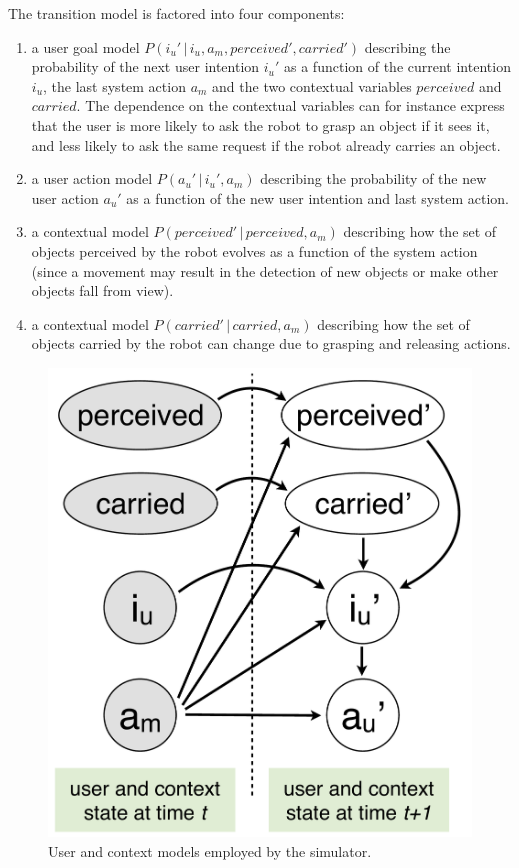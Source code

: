 The transition model is factored into four components:
\begin{enumerate}
\item a user goal model $P(i_u' \, | \, i_u, a_m, \mathit{perceived}', \mathit{carried}')$ describing the probability of the next user intention $i_u'$ as a function of the current intention $i_u$, the last system action $a_m$ and the two contextual variables $\mathit{perceived}$ and $\mathit{carried}$.  The dependence on the contextual variables can for instance express that the user is more likely to ask the robot to grasp an object if it sees it, and less likely to ask the same request if the robot already carries an object.
\item a user action model $P(a_u' \, | \, i_u', a_m)$ describing the probability of the new user action $a_u'$ as a function of the new user intention and last system action.
\item a contextual model $P(\mathit{perceived}' \, | \, \mathit{perceived}, a_m)$ describing how the set of objects perceived by the robot evolves as a function of the system action (since a movement may result in the detection of new objects or make other objects fall from view).
\item a contextual model $P(\mathit{carried}' \, | \, \mathit{carried}, a_m)$ describing how the set of objects carried by the robot can change due to grasping and releasing actions. 
\end{enumerate}

\begin{figure}
\vspace{-2mm}
\centering
\includegraphics[scale=0.25]{imgs/simulatormodels.pdf}
\caption{User and context models employed by the simulator.}
\label{fig:simulatormodels}
\end{figure}

